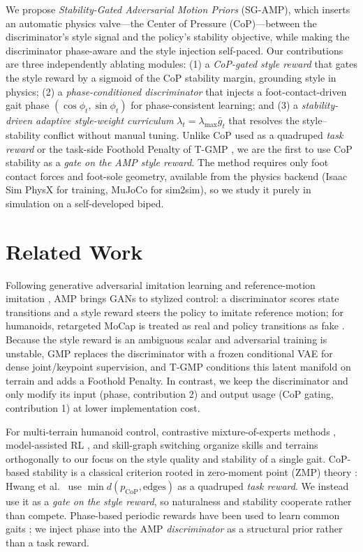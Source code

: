 \documentclass[conference]{IEEEtran}
\begin{document}
We propose \emph{Stability-Gated Adversarial Motion Priors} (SG-AMP), which inserts an automatic physics valve---the Center of Pressure (CoP)---between the discriminator's style signal and the policy's stability objective, while making the discriminator phase-aware and the style injection self-paced. Our contributions are three independently ablating modules: (1) a \emph{CoP-gated style reward} that gates the style reward by a sigmoid of the CoP stability margin, grounding style in physics; (2) a \emph{phase-conditioned discriminator} that injects a foot-contact-driven gait phase $(\cos\phi_t,\sin\phi_t)$ for phase-consistent learning; and (3) a \emph{stability-driven adaptive style-weight curriculum} $\lambda_t=\lambda_{\max}\bar g_t$ that resolves the style--stability conflict without manual tuning. Unlike CoP used as a quadruped \emph{task reward} \cite{hwang2026footposition} or the task-side Foothold Penalty of T-GMP \cite{guo2026tgmp}, we are the first to use CoP stability as a \emph{gate on the AMP style reward}. The method requires only foot contact forces and foot-sole geometry, available from the physics backend (Isaac Sim PhysX for training, MuJoCo for sim2sim), so we study it purely in simulation on a self-developed biped.

\section{Related Work}
\label{sec:related_work}

Following generative adversarial imitation learning \cite{ho2016gail} and reference-motion imitation \cite{peng2018deepmimic}, AMP \cite{peng2021amp} brings GANs to stylized control: a discriminator scores state transitions and a style reward steers the policy to imitate reference motion; for humanoids, retargeted MoCap is treated as real and policy transitions as fake \cite{zhang2025gmp, guo2026tgmp}. Because the style reward is an ambiguous scalar and adversarial training is unstable, GMP \cite{zhang2025gmp} replaces the discriminator with a frozen conditional VAE for dense joint/keypoint supervision, and T-GMP \cite{guo2026tgmp} conditions this latent manifold on terrain and adds a Foothold Penalty. In contrast, we keep the discriminator and only modify its input (phase, contribution 2) and output usage (CoP gating, contribution 1) at lower implementation cost.

For multi-terrain humanoid control, contrastive mixture-of-experts methods \cite{ma2026cmoe, huang2026coremoe}, model-assisted RL \cite{crismariu2026march}, and skill-graph switching \cite{lau2026switch} organize skills and terrains orthogonally to our focus on the style quality and stability of a single gait. CoP-based stability is a classical criterion rooted in zero-moment point (ZMP) theory \cite{vukobratovic2004zmp, kajita2003zmp}: Hwang et al.~\cite{hwang2026footposition} use $\min d(p_{\mathrm{CoP}},\text{edges})$ as a quadruped \emph{task reward}. We instead use it as a \emph{gate on the style reward}, so naturalness and stability cooperate rather than compete. Phase-based periodic rewards have been used to learn common gaits \cite{siekmann2021periodic}; we inject phase into the AMP \emph{discriminator} as a structural prior rather than a task reward.
\end{document}
